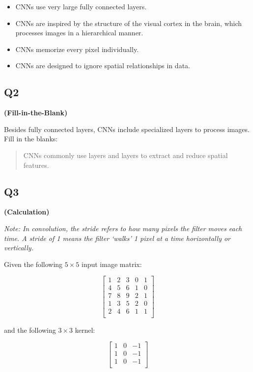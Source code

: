 \documentclass[12pt]{article}
\begin{document}
\begin{itemize}
  \item[(A)] CNNs use very large fully connected layers.
  \item[(B)] CNNs are inspired by the structure of the visual cortex in the brain, which processes images in a hierarchical manner.
  \item[(C)] CNNs memorize every pixel individually.
  \item[(D)] CNNs are designed to ignore spatial relationships in data.
\end{itemize}

\vspace{1em}
\subsection*{Q2}
\textbf{(Fill-in-the-Blank)}

Besides fully connected layers, CNNs include specialized layers to process images. Fill in the blanks:

\begin{quote}
CNNs commonly use \underline{\hspace{2cm}} layers and \underline{\hspace{2cm}} layers to extract and reduce spatial features.
\end{quote}

\vspace{1em}
\subsection*{Q3}
\textbf{(Calculation)}

\textit{Note: In convolution, the stride refers to how many pixels the filter moves each time. A stride of 1 means the filter `walks' 1 pixel at a time horizontally or vertically.}

Given the following $5 \times 5$ input image matrix:

\[
\begin{bmatrix}
1 & 2 & 3 & 0 & 1 \\
4 & 5 & 6 & 1 & 0 \\
7 & 8 & 9 & 2 & 1 \\
1 & 3 & 5 & 2 & 0 \\
2 & 4 & 6 & 1 & 1 \\
\end{bmatrix}
\]

and the following $3 \times 3$ kernel:

\[
\begin{bmatrix}
1 & 0 & -1 \\
1 & 0 & -1 \\
1 & 0 & -1 \\
\end{bmatrix}
\]
\end{document}
